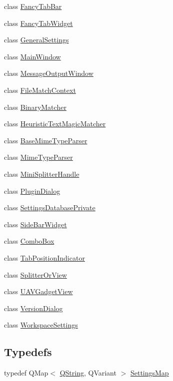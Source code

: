 \begin{DoxyCompactItemize}
class \hyperlink{class_core_1_1_internal_1_1_fancy_tab_bar}{\-Fancy\-Tab\-Bar}
\item 
class \hyperlink{class_core_1_1_internal_1_1_fancy_tab_widget}{\-Fancy\-Tab\-Widget}
\item 
class \hyperlink{class_core_1_1_internal_1_1_general_settings}{\-General\-Settings}
\item 
class \hyperlink{class_core_1_1_internal_1_1_main_window}{\-Main\-Window}
\item 
class \hyperlink{class_core_1_1_internal_1_1_message_output_window}{\-Message\-Output\-Window}
\item 
class \hyperlink{class_core_1_1_internal_1_1_file_match_context}{\-File\-Match\-Context}
\item 
class \hyperlink{class_core_1_1_internal_1_1_binary_matcher}{\-Binary\-Matcher}
\item 
class \hyperlink{class_core_1_1_internal_1_1_heuristic_text_magic_matcher}{\-Heuristic\-Text\-Magic\-Matcher}
\item 
class \hyperlink{class_core_1_1_internal_1_1_base_mime_type_parser}{\-Base\-Mime\-Type\-Parser}
\item 
class \hyperlink{class_core_1_1_internal_1_1_mime_type_parser}{\-Mime\-Type\-Parser}
\item 
class \hyperlink{class_core_1_1_internal_1_1_mini_splitter_handle}{\-Mini\-Splitter\-Handle}
\item 
class \hyperlink{class_core_1_1_internal_1_1_plugin_dialog}{\-Plugin\-Dialog}
\item 
class \hyperlink{class_core_1_1_internal_1_1_settings_database_private}{\-Settings\-Database\-Private}
\item 
class \hyperlink{class_core_1_1_internal_1_1_side_bar_widget}{\-Side\-Bar\-Widget}
\item 
class \hyperlink{class_core_1_1_internal_1_1_combo_box}{\-Combo\-Box}
\item 
class \hyperlink{class_core_1_1_internal_1_1_tab_position_indicator}{\-Tab\-Position\-Indicator}
\item 
class \hyperlink{class_core_1_1_internal_1_1_splitter_or_view}{\-Splitter\-Or\-View}
\item 
class \hyperlink{class_core_1_1_internal_1_1_u_a_v_gadget_view}{\-U\-A\-V\-Gadget\-View}
\item 
class \hyperlink{class_core_1_1_internal_1_1_version_dialog}{\-Version\-Dialog}
\item 
class \hyperlink{class_core_1_1_internal_1_1_workspace_settings}{\-Workspace\-Settings}
\end{DoxyCompactItemize}
\subsection*{\-Typedefs}
\begin{DoxyCompactItemize}
\item 
typedef \-Q\-Map$<$ \hyperlink{group___u_a_v_objects_plugin_gab9d252f49c333c94a72f97ce3105a32d}{\-Q\-String}, \-Q\-Variant $>$ \hyperlink{group___core_plugin_ga82251e6825f9c8021ae18f52f510c3fa}{\-Settings\-Map}
\end{DoxyCompactItemize}
